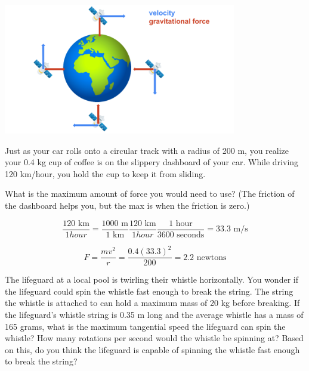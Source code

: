\begin{center}
\includegraphics[width=4in]{satellite.png}
\end{center}


\begin{Exercise}[title={Circular Motion}, label=circular]
Just as your car rolls onto a circular track with a radius of 200 m,
you realize your 0.4 kg cup of coffee is on the slippery dashboard of your
car.  While driving 120 km/hour, you hold the cup to keep it from sliding.

What is the maximum amount of force you would need to use? (The friction of
the dashboard helps you, but the max is when the friction is zero.)

\end{Exercise}
\begin{Answer}[ref=circular]
  $$\frac{120 \text{ km}}{1 hour} = \frac{1000 \text{ m}}{1 \text{ km}}\frac{120 \text{ km}}{1 hour} \frac{1 \text{ hour}}{3600 \text{ seconds}}= 33.3 \text{ m/s}$$

  $$F = \frac{m v^2}{r} = \frac {0.4 (33.3)^2}{200} = 2.2 \text{ newtons}$$
\end{Answer}

\begin{Exercise}[title = {Twirling a Whistle}, label = whistle]
The lifeguard at a local pool is twirling their whistle horizontally. You wonder if the lifeguard could spin the whistle fast enough to break the string. The string the whistle is attached to can hold a maximum mass of 20 kg before breaking. If the lifeguard's whistle string is 0.35 m long and the average whistle has a mass of 165 grams, what is the maximum tangential speed the lifeguard can spin the whistle? How many rotations per second would the whistle be spinning at? Based on this, do you think the lifeguard is capable of spinning the whistle fast enough to break the string?
\end{Exercise}

